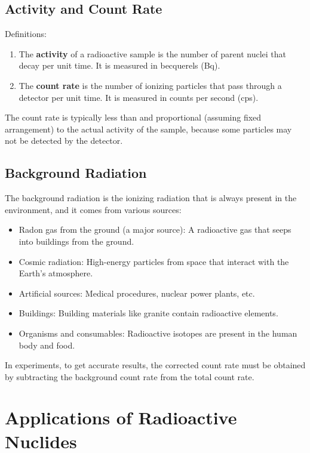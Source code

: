 \documentclass[a4paper,12pt]{article}
\let\oldsection\section
\renewcommand\section{\clearpage\oldsection}
\begin{document}
\subsection{Activity and Count Rate}

Definitions:
\begin{enumerate}
  \item The \textbf{activity} of a radioactive sample is the number of parent nuclei that decay per unit time. It is measured in becquerels (Bq).
  \item The \textbf{count rate} is the number of ionizing particles that pass through a detector per unit time. It is measured in counts per second (cps).
\end{enumerate}

The count rate is typically less than and proportional (assuming fixed arrangement) to the actual activity of the sample, because some particles may not be detected by the detector.

\pagebreak

\subsection{Background Radiation}

The background radiation is the ionizing radiation that is always present in the environment, and it comes from various sources:
\begin{itemize}
  \item Radon gas from the ground (a major source): A radioactive gas that seeps into buildings from the ground.
  \item Cosmic radiation: High-energy particles from space that interact with the Earth's atmosphere.
  \item Artificial sources: Medical procedures, nuclear power plants, etc.
  \item Buildings: Building materials like granite contain radioactive elements.
  \item Organisms and consumables: Radioactive isotopes are present in the human body and food.
\end{itemize}

In experiments, to get accurate results, the corrected count rate must be obtained by subtracting the background count rate from the total count rate.

\section{Applications of Radioactive Nuclides}
\end{document}
